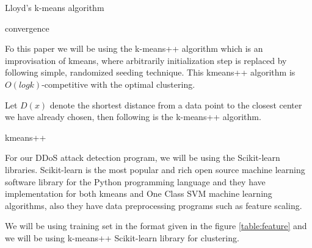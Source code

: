 \documentclass[10pt,oneside,a4paper]{article}
\begin{document}
\begin{algorithm}
\caption{Lloyd's k-means algorithm}\label{kmeans}
\begin{algorithmic}
\Repeat
  \EndFor
  \EndFor
\Until convergence
\end{algorithmic}
\end{algorithm}

Fo this paper we will be using the k-means++ algorithm\cite{k-means++} which is an improvisation of kmeans, where arbitrarily initialization step is replaced by following simple, randomized seeding technique. This kmeans++ algorithm is $O(log k)$-competitive with the optimal clustering.

Let $D(x)$ denote the shortest distance from a data point to the closest center we have already chosen, then following is the k-means++ algorithm.

\begin{algorithm}
\caption{kmeans++}\label{kmeans++}
\begin{algorithmic}[1]
\end{algorithmic}
\end{algorithm}

For our DDoS attack detection program, we will be using the Scikit-learn libraries. Scikit-learn is the most popular and rich open source machine learning software library for the Python programming language and they have implementation for both kmeans and One Class SVM machine learning algorithms, also they have data preprocessing programs such as feature scaling.

We will be using training set in the format given in the figure \ref{table:feature} and we will be using k-means++ Scikit-learn library for clustering.
\end{document}
